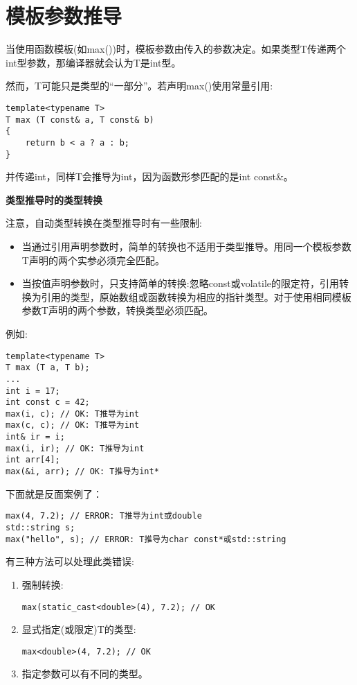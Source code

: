 \section{模板参数推导}

当使用函数模板(如max())时，模板参数由传入的参数决定。如果类型T传递两个int型参数，那编译器就会认为T是int型。

然而，T可能只是类型的“一部分”。若声明max()使用常量引用:

\begin{lstlisting}[style=styleCXX]
template<typename T>
T max (T const& a, T const& b)
{
	return b < a ? a : b;
}
\end{lstlisting}

并传递int，同样T会推导为int，因为函数形参匹配的是int const\&。

\noindent
\textbf{类型推导时的类型转换}

注意，自动类型转换在类型推导时有一些限制:

\begin{itemize}
\item
当通过引用声明参数时，简单的转换也不适用于类型推导。用同一个模板参数T声明的两个实参必须完全匹配。

\item
当按值声明参数时，只支持简单的转换:忽略const或volatile的限定符，引用转换为引用的类型，原始数组或函数转换为相应的指针类型。对于使用相同模板参数T声明的两个参数，转换类型必须匹配。
\end{itemize}

例如:

\begin{lstlisting}[style=styleCXX]
template<typename T>
T max (T a, T b);
...
int i = 17;
int const c = 42;
max(i, c); // OK: T推导为int
max(c, c); // OK: T推导为int
int& ir = i;
max(i, ir); // OK: T推导为int
int arr[4];
max(&i, arr); // OK: T推导为int*
\end{lstlisting}

下面就是反面案例了：

\begin{lstlisting}[style=styleCXX]
max(4, 7.2); // ERROR: T推导为int或double
std::string s;
max("hello", s); // ERROR: T推导为char const*或std::string
\end{lstlisting}

有三种方法可以处理此类错误:

\begin{enumerate}
\item
强制转换:
\begin{lstlisting}[style=styleCXX]
max(static_cast<double>(4), 7.2); // OK
\end{lstlisting}

\item
显式指定(或限定)T的类型:
\begin{lstlisting}[style=styleCXX]
max<double>(4, 7.2); // OK
\end{lstlisting}

\item
指定参数可以有不同的类型。
\end{enumerate}

